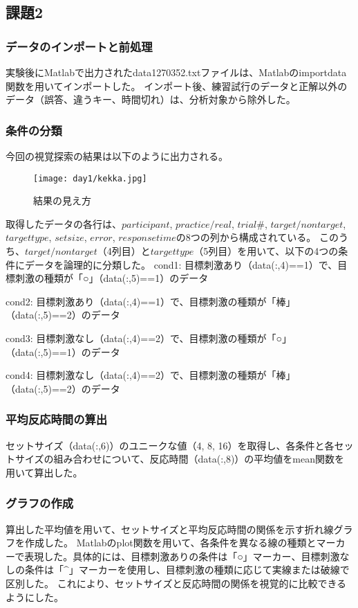 \documentclass{jlreq}
\begin{document}
\subsection{課題2}
\subsubsection{データのインポートと前処理}
実験後にMatlabで出力されたdata1270352.txtファイルは、Matlabのimportdata関数を用いてインポートした。
インポート後、練習試行のデータと正解以外のデータ（誤答、違うキー、時間切れ）は、分析対象から除外した。
\subsubsection{条件の分類}
今回の視覚探索の結果は以下のように出力される。
\begin{figure}[H]
    \centering
    \texttt{[image: day1/kekka.jpg]}
    \caption{結果の見え方}
    \label{fig:kadai1}
\end{figure}
取得したデータの各行は、$participant$, $practice/real$, $trial\#$, $target/nontarget$, $target type$, $setsize$, $error$, $responsetime$の8つの列から構成されている。
このうち、$target/nontarget$（4列目）と$target type$（5列目）を用いて、以下の4つの条件にデータを論理的に分類した。
cond1: 目標刺激あり（data(:,4)==1）で、目標刺激の種類が「○」（data(:,5)==1）のデータ

cond2: 目標刺激あり（data(:,4)==1）で、目標刺激の種類が「棒」（data(:,5)==2）のデータ

cond3: 目標刺激なし（data(:,4)==2）で、目標刺激の種類が「○」（data(:,5)==1）のデータ

cond4: 目標刺激なし（data(:,4)==2）で、目標刺激の種類が「棒」（data(:,5)==2）のデータ
\subsubsection{平均反応時間の算出}
セットサイズ（data(:,6)）のユニークな値（4, 8, 16）を取得し、各条件と各セットサイズの組み合わせについて、反応時間（data(:,8)）の平均値をmean関数を用いて算出した。
\subsubsection{グラフの作成}
算出した平均値を用いて、セットサイズと平均反応時間の関係を示す折れ線グラフを作成した。
Matlabのplot関数を用いて、各条件を異なる線の種類とマーカーで表現した。具体的には、目標刺激ありの条件は「○」マーカー、目標刺激なしの条件は「$\^$」マーカーを使用し、目標刺激の種類に応じて実線または破線で区別した。
これにより、セットサイズと反応時間の関係を視覚的に比較できるようにした。
\end{document}
